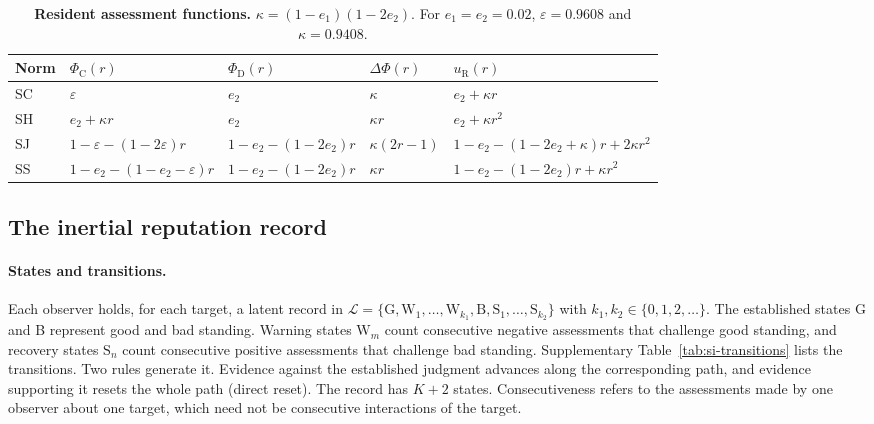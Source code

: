 \documentclass[fleqn,10pt]{wlscirep}
\newcommand{\Lspace}{\mathscr{L}}          %
\newcommand{\st}[1]{\mathrm{#1}}           %
\newcommand{\PhiC}{\Phi_{\mathrm{C}}}
\newcommand{\PhiD}{\Phi_{\mathrm{D}}}
\theoremstyle{plain}
\begin{document}
\begin{table}[!htbp]
\centering
\caption{\textbf{Resident assessment functions.} $\kappa=(1-e_1)(1-2e_2)$. For $e_1=e_2=0.02$, $\varepsilon=0.9608$ and $\kappa=0.9408$.}
\label{tab:si-resident}
\small
\begin{tabular}{@{}lllll@{}}
\toprule
Norm & $\PhiC(r)$ & $\PhiD(r)$ & $\Delta\Phi(r)$ & $u_{\mathrm R}(r)$\\
\midrule
SC & $\varepsilon$ & $e_2$ & $\kappa$ & $e_2+\kappa r$\\
SH & $e_2+\kappa r$ & $e_2$ & $\kappa r$ & $e_2+\kappa r^2$\\
SJ & $1-\varepsilon-(1-2\varepsilon)r$ & $1-e_2-(1-2e_2)r$ & $\kappa(2r-1)$ & $1-e_2-(1-2e_2+\kappa)r+2\kappa r^2$\\
SS & $1-e_2-(1-e_2-\varepsilon)r$ & $1-e_2-(1-2e_2)r$ & $\kappa r$ & $1-e_2-(1-2e_2)r+\kappa r^2$\\
\bottomrule
\end{tabular}
\end{table}

\subsection{The inertial reputation record}
\label{si:record}

\paragraph{States and transitions.} Each observer holds, for each target, a latent record in $\Lspace=\{\st G,\st W_1,\ldots,\st W_{k_1},\st B,\st S_1,\ldots,\st S_{k_2}\}$ with $k_1,k_2\in\{0,1,2,\ldots\}$. The established states G and B represent good and bad standing. Warning states $\st W_m$ count consecutive negative assessments that challenge good standing, and recovery states $\st S_n$ count consecutive positive assessments that challenge bad standing. Supplementary Table~\ref{tab:si-transitions} lists the transitions. Two rules generate it. Evidence against the established judgment advances along the corresponding path, and evidence supporting it resets the whole path (direct reset). The record has $K+2$ states. Consecutiveness refers to the assessments made by one observer about one target, which need not be consecutive interactions of the target.
\end{document}
